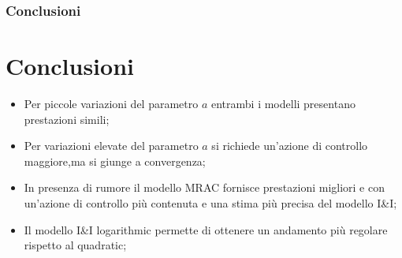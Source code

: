 \documentclass{beamer}
\begin{document}
\begin{frame}
	\frametitle{Conclusioni}
	\section{Conclusioni}
	\begin{itemize}
		\item Per piccole variazioni del parametro \(a\) entrambi i modelli presentano prestazioni simili;
  \item Per variazioni elevate del parametro \(a\) si richiede un'azione di controllo maggiore,ma si giunge a convergenza;
  \item In presenza di rumore il modello MRAC fornisce prestazioni migliori e con un'azione di controllo più contenuta e una stima più precisa del modello I\&I;
\item Il modello I\&I logarithmic permette di ottenere un andamento più regolare rispetto al quadratic;
	\end{itemize}
\end{frame}
\end{document}
